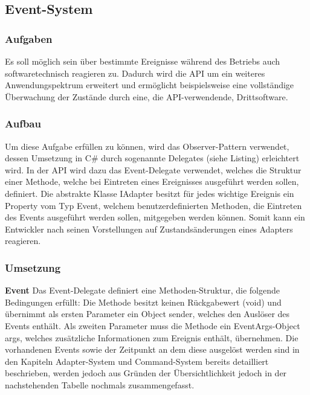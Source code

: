 
\subsection{Event-System}

\subsubsection{Aufgaben}
Es soll möglich sein über bestimmte Ereignisse während des Betriebs auch softwaretechnisch reagieren zu. Dadurch wird die API um ein weiteres Anwendungspektrum erweitert und ermöglicht beispielsweise eine vollständige Überwachung der Zustände durch eine, die API-verwendende, Drittsoftware.

\subsubsection{Aufbau}
Um diese Aufgabe erfüllen zu können, wird das Observer-Pattern verwendet, dessen Umsetzung in C\# durch sogenannte Delegates (siehe Listing) erleichtert wird. In der API wird dazu das Event-Delegate verwendet, welches die Struktur einer Methode, welche bei Eintreten eines Ereignisses ausgeführt werden sollen, definiert. 
\newline
Die abstrakte Klasse IAdapter besitzt für jedes wichtige Ereignis ein Property vom Typ Event, welchem benutzerdefinierten Methoden, die Eintreten des Events ausgeführt werden sollen, mitgegeben werden können. Somit kann ein Entwickler nach seinen Vorstellungen auf Zustandsänderungen eines Adapters reagieren.

\subsubsection{Umsetzung}
\textbf{Event}
\newline
Das Event-Delegate definiert eine Methoden-Struktur, die folgende Bedingungen erfüllt:
\newline
Die Methode besitzt keinen Rückgabewert (void) und übernimmt als ersten Parameter ein Object sender, welches den Auslöser des Events enthält. Als zweiten Parameter muss die Methode ein EventArgs-Object args, welches zusätzliche Informationen zum Ereignis enthält, übernehmen.
\newline
Die vorhandenen Events sowie der Zeitpunkt an dem diese ausgelöst werden sind in den Kapiteln Adapter-System und Command-System bereits detailliert beschrieben, werden jedoch aus Gründen der Übersichtlichkeit jedoch in der nachstehenden Tabelle nochmals zusammengefasst.
